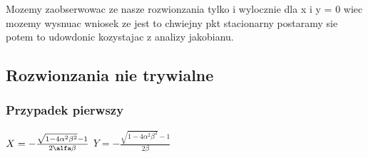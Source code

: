 \documentclass{article}
\begin{document}
\begin{figure}[ht]
\begin{minipage}{.5\textwidth}
            \label{fig:test13}
        \end{minipage}%
    \end{figure}

    Mozemy zaobserwowac ze nasze rozwionzania tylko i wylocznie dla x i y = 0 wiec mozemy wysnuac wniosek ze jest to chwiejny pkt stacionarny postaramy sie potem to udowdonic kozystajac z analizy jakobianu.

    \newpage

    \subsection{Rozwionzania nie trywialne}

    \subsubsection{Przypadek pierwszy}

    \begin{center}
        $X = - \frac{\sqrt{1-4\alpha^2 \beta^2} - 1 }{2\alfa\beta}$ \hspace{0.5cm}
        $Y = - \frac{\sqrt{1-4\alpha^2 \beta^2} - 1 }{2\beta}$
    \end{center}
\end{document}
